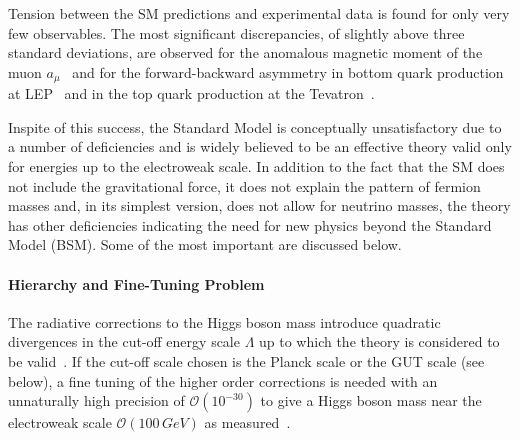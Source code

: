 Tension between the SM predictions and  experimental data is found for only very few observables. 
The most significant discrepancies, of slightly above three standard deviations, are observed for the anomalous magnetic moment 
of the muon $a_{\mu}$~\cite{gminus2} and for the forward-backward asymmetry in bottom quark production at LEP~\cite{smtest}
and in the top quark production at the Tevatron~\cite{FBasymmetry}.   


Inspite of this success, the Standard Model is conceptually unsatisfactory due to a number of deficiencies and is
widely believed to be an effective theory valid only for energies up to the electroweak scale. In addition to the fact that 
the SM does not  include the  gravitational force, it does not explain the pattern of fermion masses and, in its simplest 
version, does not allow for neutrino masses, the theory has other deficiencies indicating the need 
for new physics beyond the Standard Model (BSM). Some of the most important are discussed below.
\paragraph{Hierarchy and Fine-Tuning Problem} The radiative corrections to the Higgs boson mass introduce quadratic divergences in  
	the cut-off energy scale $\Lambda$ up to which the theory is considered to be valid~\cite{Lambda}.
	If the cut-off scale chosen is the Planck scale or the GUT scale (see below), a fine tuning of the 
	higher order corrections is needed with an unnaturally high precision of $\mathcal{O}(10^{-30})$ 
	to give a  Higgs boson mass near the electroweak scale $\mathcal{O}(100\,GeV)$ as measured~\cite{Hierarchy1,Hierarchy2,Hierarchy3}.



